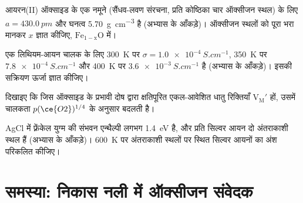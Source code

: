 \begin{exercise}[$\star\star$]\label{exo:b3:solid-state:9}
आयरन(II) ऑक्साइड के एक नमूने (सैंधव-लवण संरचना, प्रति कोष्ठिका चार ऑक्सीजन स्थल) के लिए
$a = \qty{430.0}{pm}$ और घनत्व \qty{5.70}{g.cm^{-3}} है (अभ्यास के आँकड़े)। ऑक्सीजन स्थलों को
पूरा भरा मानकर $x$ ज्ञात कीजिए, $\mathrm{Fe_{1-x}O}$ में।
\end{exercise}

\begin{exercise}[$\star\star\star$]\label{exo:b3:solid-state:10}
एक लिथियम-आयन चालक के लिए \qty{300}{K} पर $\sigma = \qty{1.0e-4}{S.cm^{-1}}$, \qty{350}{K} पर $\qty{7.8e-4}{S.cm^{-1}}$ और
\qty{400}{K} पर $\qty{3.6e-3}{S.cm^{-1}}$ है (अभ्यास के आँकड़े)। इसकी सक्रियण ऊर्जा ज्ञात कीजिए।
\end{exercise}

\begin{exercise}[$\star\star\star$]\label{exo:b3:solid-state:11}
दिखाइए कि जिस ऑक्साइड के प्रभावी दोष  द्वारा क्षतिपूरित एकल-आवेशित धातु रिक्तियाँ
$\mathrm{V_M'}$ हों, उसमें चालकता $p(\ce{O2})^{1/4}$ के अनुसार बदलती है।
\end{exercise}

\begin{exercise}[$\star\star\star$]\label{exo:b3:solid-state:12}
AgCl में फ़्रेंकेल युग्म की संभवन एन्थैल्पी लगभग \qty{1.4}{eV} है, और प्रति सिल्वर आयन
दो अंतराकाशी स्थल हैं (अभ्यास के आँकड़े)। \qty{600}{K} पर अंतराकाशी स्थलों पर स्थित
सिल्वर आयनों का अंश परिकलित कीजिए।
\end{exercise}

\section{समस्या: निकास नली में ऑक्सीजन संवेदक}

